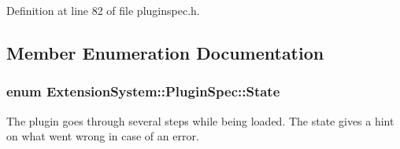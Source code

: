 Definition at line 82 of file pluginspec.\-h.



\subsection{Member Enumeration Documentation}
\hypertarget{class_extension_system_1_1_plugin_spec_a3d40e1bd1f17eb32b314bcd282b3e3b9}{
\subsubsection[{State}]{\setlength{\rightskip}{0pt plus 5cm}enum {\bf Extension\-System\-::\-Plugin\-Spec\-::\-State}}}\label{class_extension_system_1_1_plugin_spec_a3d40e1bd1f17eb32b314bcd282b3e3b9}
The plugin goes through several steps while being loaded. The state gives a hint on what went wrong in case of an error.

